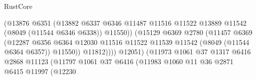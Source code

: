 \begin{lexlean}{RustCore}
\begin{coremodule}
                                              (@13876
                                                @6351
                                                (@13882
                                                  @6337
                                                  @6346
                                                  @11487
                                                  @11516
                                                  @11522
                                                  @13889
                                                  @11542
                                                  (@8049 (@11544 @6346 @6338))
                                                  @11550))
                                              (@15129
                                                @6369
                                                @2780
                                                (@11457
                                                  @6369
                                                  (@12287
                                                    @6356
                                                    @6364
                                                    @12030
                                                    @11516
                                                    @11522
                                                    @11539
                                                    @11542
                                                    (@8049 (@11544 @6364 @6357))
                                                    @11550))
                                                @11812))))
                                        @12051)
                                      (@11973
                                        @1061
                                        @37
                                        @1317
                                        @6416
                                        @2868
                                        @11123
                                        (@11797
                                          @1061
                                          @37
                                          @6416
                                          (@11983
                                            @1060
                                            @11
                                            @36
                                            @2871
                                            @6415
                                            @11997
                                            (@12230

\end{coremodule}
\end{lexlean}
